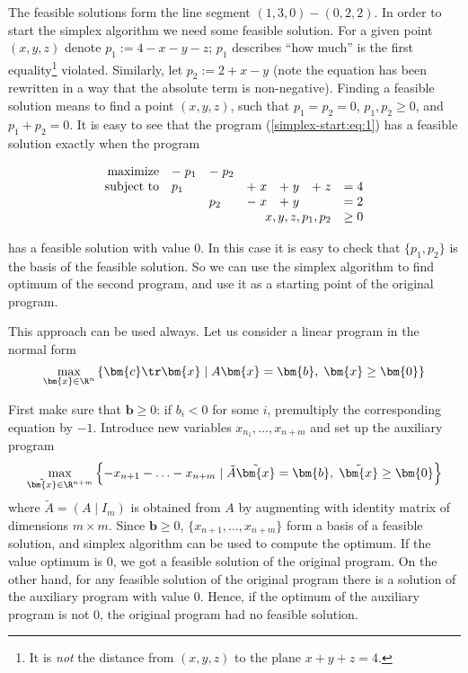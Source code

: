 \vskip 2mm
\noindent
The feasible solutions form the line segment $(1,3,0) - (0,2,2)$.
In order to start the simplex algorithm we need some feasible solution. For a given
point $(x,y,z)$ denote  $p_1:=4-x-y-z$; $p_1$ describes ``how much'' is the first equality\footnote{%
It is {\em not} the distance from $(x,y,z)$ to the plane $x+y+z=4$.} violated. Similarly,
let  $p_2:=2+x-y$  (note the equation has been rewritten in a way that the absolute term is non-negative).
Finding a feasible solution means to find a point $(x,y,z)$, such that  $p_1=p_2=0$, \ie  
$p_1,p_2\ge0$, and $p_1+p_2=0$. It is easy to see that the program  (\ref{simplex-start:eq:1})
has a feasible solution exactly when the program

\begin{equation}
  \label{simplex-start:eq:2}
  \begin{array}{rllllll}
    \text{maximize}& -\;p_1 & -\;p_2 & \\
    \text{subject to}& p_1 & &+\;x & +\;y & +\;z & =4\\
                           & & p_2 & -\;x& +\;y & & = 2\\
\multicolumn{6}{r}{x,y,z,p_1,p_2}&\ge 0
 

  \end{array}
\end{equation}

\noindent
has a feasible solution with value $0$.
In this case it is easy to check that  $\{p_1,p_2\}$ is the basis of the feasible solution.
So we can use the simplex algorithm to find optimum of the second program, and use it as a starting
point of the original program.

\noindent
This approach can be used always. Let us consider a linear program in the normal form
$$ \max_{\bm{x}\in\R^n}\left\{ \bm{c}\tr\bm{x} \mid A\bm{x}=\bm{b},\;\bm{x}\ge\bm{0}\right\}$$


\noindent
First make sure that  $\bm{b}\ge0$: if $b_i<0$ for some $i$, premultiply the corresponding equation 
by $-1$. Introduce new variables  $x_{n_1},\ldots,x_{n+m}$  and set up the auxiliary program
$$ \max_{\tilde{\bm{x}}\in\R^{n+m}}\left\{ -x_{n+1}-\ldots-x_{n+m} \mid \tilde{A}\tilde{\bm{x}}=\bm{b},\;\tilde{\bm{x}}\ge\bm{0}\right\}$$
where $\tilde{A}=(A\mid I_m)$ is obtained from $A$ by augmenting with identity matrix of dimensions $m\times m$.
Since  $\bm{b}\ge0$, $\{x_{n+1},\ldots,x_{n+m}\}$ form a basis of a feasible solution, and simplex algorithm can be used
to compute the optimum. If the value optimum is 0, we got a feasible solution of the original program. 
On the other hand, for any feasible solution of the original program there is a solution of the auxiliary program with value 0. Hence, if the optimum of the auxiliary program is not 0, the original program had no feasible solution.

